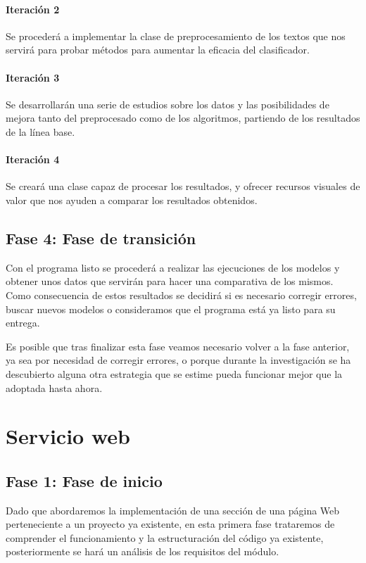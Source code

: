 \paragraph{Iteración 2} Se procederá a implementar la clase de preprocesamiento de los textos que nos servirá para probar métodos para aumentar la eficacia del clasificador.

\paragraph{Iteración 3} Se desarrollarán una serie de estudios sobre los datos y las posibilidades de mejora tanto del preprocesado como de los algoritmos, partiendo de los resultados de la línea base.

\paragraph{Iteración 4} Se creará una clase capaz de procesar los resultados, y ofrecer recursos visuales de valor que nos ayuden a comparar los resultados obtenidos. 

\subsection{Fase 4: Fase de transición}
Con el programa listo se procederá a realizar las ejecuciones de los modelos y obtener unos datos que servirán para hacer una comparativa de los mismos. Como consecuencia de estos resultados se decidirá si es necesario corregir errores, buscar nuevos modelos o consideramos que el programa está ya listo para su entrega.

Es posible que tras finalizar esta fase veamos necesario volver a la fase anterior, ya sea por necesidad de corregir errores, o porque durante la investigación se ha descubierto alguna otra estrategia que se estime pueda funcionar mejor que la adoptada hasta ahora.

\section{Servicio web}

\subsection{Fase 1: Fase de inicio}
Dado que abordaremos la implementación de una sección de una página Web perteneciente a un proyecto ya existente, en esta primera fase trataremos de comprender el funcionamiento y la estructuración del código ya existente, posteriormente se hará un análisis de los requisitos del módulo.

